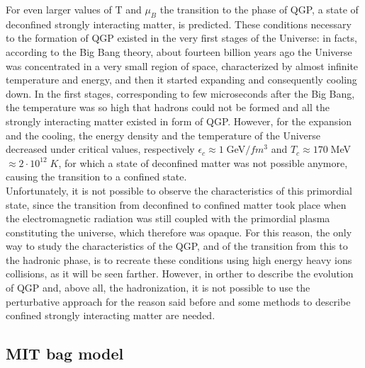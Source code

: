 For even larger values of T and $\mu_{B}$ the transition to the phase of QGP, a state of deconfined strongly interacting matter, is predicted. These conditions necessary to the formation of QGP existed in the very first stages of the Universe: in facts, according to the Big Bang theory, about fourteen billion years ago the Universe was concentrated in a very small region of space, characterized by almost infinite temperature and energy, and then it started expanding and consequently cooling down. In the first stages, corresponding to few microseconds after the Big Bang, the temperature was so high that hadrons could not be formed and all the strongly interacting matter existed in form of QGP. However, for the expansion and the cooling, the energy density and the temperature of the Universe decreased under critical values, respectively $\epsilon_{c}\approx1 \;$GeV$/fm^{3}$ and $T_{c}\approx 170\; $MeV $ \approx 2\cdot10^{12}\; K$, for which a state of deconfined matter was not possible anymore, causing the transition to a confined state.\\ Unfortunately, it is not possible to observe the characteristics of this primordial state, since the transition from deconfined to confined matter took place when the electromagnetic radiation was still coupled with the primordial plasma constituting the universe, which therefore was opaque. For this reason, the only way to study the characteristics of the QGP, and of the transition from this to the hadronic phase, is to recreate these conditions using high energy heavy ions collisions, as it will be seen farther.
However, in orther to describe the evolution of QGP and, above all, the hadronization, it is not possible to use the perturbative approach for the reason said before and some methods to describe confined strongly interacting matter are needed.

\subsection{MIT bag model}

